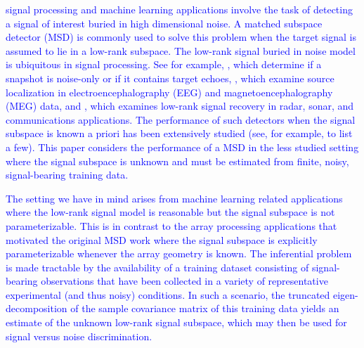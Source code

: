 \textcolor{blue}{ signal processing  \cite{scharf1991statistical} and machine learning \cite{friedman2001elements} applications involve the task of detecting a signal of interest buried in high dimensional noise. A matched subspace detector (MSD) is commonly used to solve this problem when the target signal is assumed to lie in a low-rank subspace.  The low-rank signal buried in noise model is ubiquitous in signal processing. See for example, \cite{besson2006cfar,bandiera2007glrt, bandiera2007adaptive}, which determine if a snapshot is noise-only or if it contains target echoes, \cite{maris2003resampling, soong1995principal}, which examine source localization in electroencephalography (EEG) and magnetoencephalography (MEG) data, and \cite{besson2005matched}, which examines low-rank signal recovery in radar, sonar, and communications applications. The performance of such detectors when the signal subspace is known a priori has been extensively studied (see, for example, \cite{besson2006cfar,scharf1994matched,jin2005cfar,mcwhorter2003matched, vincent2008matched} to list a few). This paper considers the performance of a MSD in the less studied setting where the signal subspace is unknown and must be estimated from finite, noisy, signal-bearing training data.}

\textcolor{blue}{The setting we have in mind arises from machine learning related applications where the low-rank signal model is reasonable but the signal subspace is not parameterizable. This is in contrast to the array processing applications that motivated the original MSD work \cite{scharf1994matched} where the signal subspace is explicitly parameterizable whenever the array geometry is known. The inferential problem is made tractable by the availability of a training dataset consisting of signal-bearing observations that have been collected in a variety of representative experimental (and thus noisy) conditions. In such a scenario,  the truncated eigen-decomposition of the sample covariance matrix of this training data yields an estimate of the unknown low-rank signal subspace, which may then be used for signal versus noise discrimination.}

